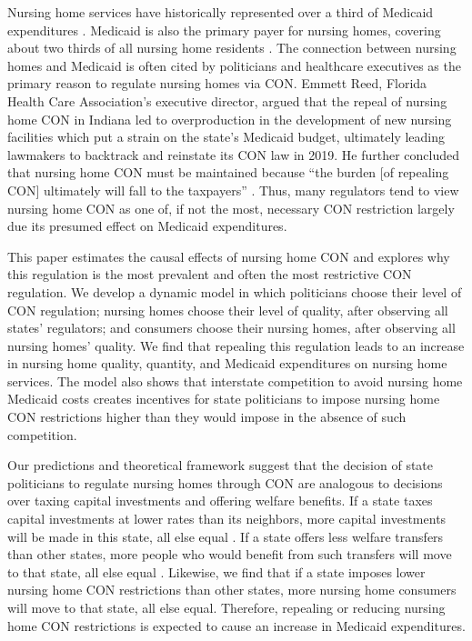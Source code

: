 \documentclass[../Main.tex]{subfiles}
\begin{document}
Nursing home services have historically represented over a third of Medicaid expenditures \citep{wiener1999controlling}. Medicaid is also the primary payer for nursing homes, covering about two thirds of all nursing home residents . The connection between nursing homes and Medicaid is often cited by politicians and healthcare executives as the primary reason to regulate nursing homes via CON. Emmett Reed, Florida Health Care Association’s executive director, argued that the repeal of nursing home CON in Indiana led to overproduction in the development of new nursing facilities which put a strain on the state’s Medicaid budget, ultimately leading lawmakers to backtrack and reinstate its CON law in 2019. He further concluded that nursing home CON must be maintained because “the burden [of repealing CON] ultimately will fall to the taxpayers” \citep{sexton2019conrepeal}. Thus, many regulators tend to view nursing home CON as one of, if not the most, necessary CON restriction largely due its presumed effect on Medicaid expenditures. 

This paper estimates the causal effects of nursing home CON and explores why this regulation is the most prevalent and often the most restrictive CON regulation. We develop a dynamic model in which politicians choose their level of CON regulation; nursing homes choose their level of quality, after observing all states' regulators; and consumers choose their nursing homes, after observing all nursing homes' quality. We find that repealing this regulation leads to an increase in nursing home quality, quantity, and Medicaid expenditures on nursing home services. The model also shows that interstate competition to avoid nursing home Medicaid costs creates incentives for state politicians to impose nursing home CON restrictions higher than they would impose in the absence of such competition. 

Our predictions and theoretical framework suggest that the decision of state politicians to regulate nursing homes through CON are analogous to decisions over taxing capital investments and offering welfare benefits. If a state taxes capital investments at lower rates than its neighbors, more capital investments will be made in this state, all else equal \citep{zodrow1986pigou,bucovetsky1991asymmetric, kanbur1993jeux, basinger2004remodeling, plumper2009there}. If a state offers less welfare transfers than other states, more people who would benefit from such transfers will move to that state, all else equal \citep{gramlich1984migration, peterson1989american, saavedra2000model}. Likewise, we find that if a state imposes lower nursing home CON restrictions than other states, more nursing home consumers will move to that state, all else equal. Therefore, repealing or reducing nursing home CON restrictions is expected to cause an increase in Medicaid expenditures.
\end{document}
